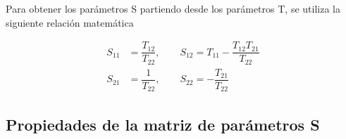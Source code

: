 Para obtener los parámetros S partiendo desde los parámetros T, se utiliza la siguiente relación matemática

\begin{equation}
	\begin{aligned}
		S_{11} &= \dfrac{T_{12}}{T_{22}},\qquad S_{12} = T_{11} - \dfrac{T_{12}T_{21}}{T_{22}} \\
		S_{21} &= \dfrac{1}{T_{22}},\qquad S_{22} = - \dfrac{T_{21}}{T_{22}}
	\end{aligned}
	\label{eq:t2s}
\end{equation}


\subsection{Propiedades de la matriz de parámetros S}

